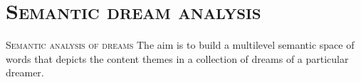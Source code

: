 \documentclass[xcolor=x11names,compress]{beamer}
\begin{document}
\section{\scshape Semantic dream analysis}
{
\begin{frame}[c]{}
    \centering
    {\scshape \LARGE \color{redUnicam} Semantic analysis of dreams} \newline \newline
    {The aim is to build a multilevel semantic space of words that depicts the content themes in a collection of
    dreams of a particular dreamer.}
\end{frame}}
\end{document}

